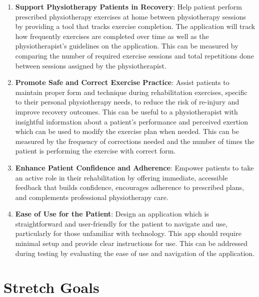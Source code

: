 \documentclass{article}
\begin{document}
\begin{enumerate}
  \item \textbf{Support Physiotherapy Patients in Recovery}: Help patient perform prescribed physiotherapy exercises at home between physiotherapy sessions by providing a tool that tracks exercise completion. The application will track how frequently exercises are completed over time as well as the physiotherapist's guidelines on the application. This can be measured by comparing the number of required exercise sessions and total repetitions done between sessions assigned by the physiotherapist.

  \item \textbf{Promote Safe and Correct Exercise Practice}: Assist patients to maintain proper form and technique during rehabilitation exercises, specific to their personal physiotherapy needs, to reduce the risk of re-injury and improve recovery outcomes. This can be useful to a physiotherapist with insightful information about a patient's performance and perceived exertion which can be used to modify the exercise plan when needed. This can be measured by the frequency of corrections needed and the number of times the patient is performing the exercise with correct form.

  \item \textbf{Enhance Patient Confidence and Adherence}: Empower patients to take an active role in their rehabilitation by offering immediate, accessible feedback that builds confidence, encourages adherence to prescribed plans, and complements professional physiotherapy care.
  
  \item \textbf{Ease of Use for the Patient}: Design an application which is straightforward and user-friendly for the patient to navigate and use, particularly for those unfamiliar with technology. This app should require minimal setup and provide clear instructions for use. This can be addressed during testing by evaluating the ease of use and navigation of the application.

\end{enumerate}

\section{Stretch Goals}
\end{document}
